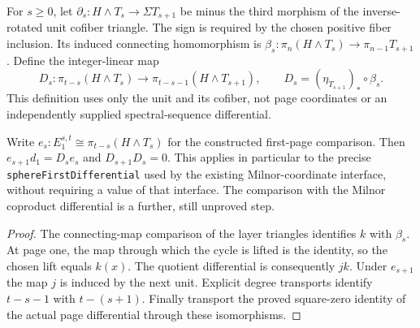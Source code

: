 \begin{definition}
  \label{def:h6-resolution-differential}
  \leanok
  For $s\ge0$, let $\partial_s:H\wedge T_s\to\Sigma T_{s+1}$ be
  minus the third morphism of the inverse-rotated unit cofiber triangle.
  The sign is required by the chosen positive fiber inclusion.
  Its induced connecting homomorphism is
  $\beta_s:\pi_n(H\wedge T_s)\to\pi_{n-1}T_{s+1}$.
  Define the integer-linear map
  \[
    D_s:\pi_{t-s}(H\wedge T_s)\longrightarrow
      \pi_{t-s-1}(H\wedge T_{s+1}),\qquad
    D_s=(\eta_{T_{s+1}})_*\circ\beta_s.
  \]
  This definition uses only the unit and its cofiber, not page coordinates
  or an independently supplied spectral-sequence differential.
\end{definition}

\begin{proposition}
  \label{prop:h6-first-differential-homology}
  \leanok
  Write $e_s:E_1^{s,t}\cong\pi_{t-s}(H\wedge T_s)$ for the constructed
  first-page comparison. Then $e_{s+1}d_1=D_se_s$ and $D_{s+1}D_s=0$.
  This applies in particular to the precise \texttt{sphereFirstDifferential}
  used by the existing Milnor-coordinate interface, without requiring a
  value of that interface. The comparison with the Milnor coproduct
  differential is a further, still unproved step.
\end{proposition}
\begin{proof}
  The connecting-map comparison of the layer triangles identifies $k$
  with $\beta_s$. At page one, the map through which the cycle is lifted
  is the identity, so the chosen lift equals $k(x)$. The quotient
  differential is consequently $jk$. Under $e_{s+1}$ the map $j$ is
  induced by the next unit. Explicit degree transports identify
  $t-s-1$ with $t-(s+1)$. Finally transport the proved square-zero
  identity of the actual page differential through these isomorphisms.
  \leanok
\end{proof}

